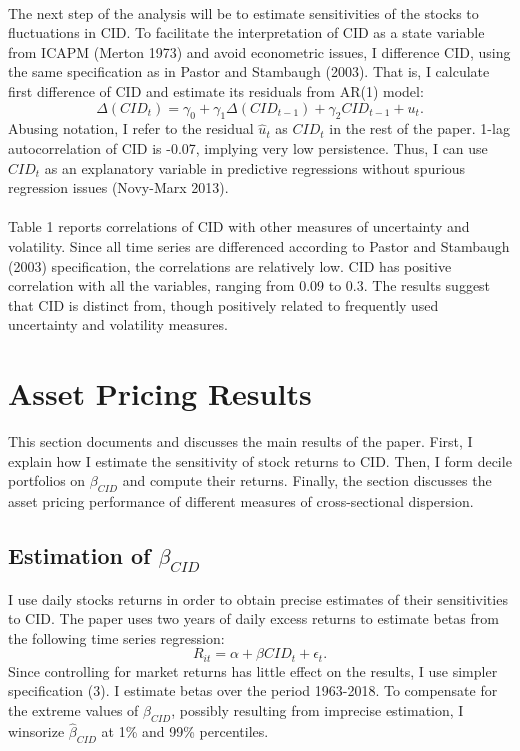 \documentclass[12pt]{article}
\begin{document}
\paragraph{}
The next step of the analysis will be to estimate sensitivities of the stocks to fluctuations in CID. To facilitate the interpretation of CID as a state variable from ICAPM (Merton 1973) and avoid econometric issues, I difference CID, using the same specification as in Pastor and Stambaugh (2003). That is, I calculate first difference of CID and estimate its residuals from AR(1) model:
\begin{equation}
\Delta(CID_t) = \gamma_0 + \gamma_1 \Delta(CID_{t-1}) + \gamma_2 CID_{t-1} + u_t.
\end{equation}
Abusing notation, I refer to the residual $\hat{u}_t$ as $CID_t$ in the rest of the paper. 1-lag autocorrelation of CID is -0.07, implying very low persistence. Thus, I can use $CID_t$ as an explanatory variable in predictive regressions without spurious regression issues (Novy-Marx 2013). 
\paragraph{}
Table 1 reports correlations of CID with other measures of uncertainty and volatility. Since all time series are differenced according to Pastor and Stambaugh (2003) specification, the correlations are relatively low. CID has positive correlation with all the variables, ranging from 0.09 to 0.3. The results suggest that CID is distinct from, though positively related to frequently used uncertainty and volatility measures.

\section{Asset Pricing Results} \label{sec:Model}

This section documents and discusses the main results of the paper. First, I explain how I estimate the sensitivity of stock returns to CID. Then, I form decile portfolios on $\beta_{CID}$ and compute their returns. Finally, the section discusses the asset pricing performance of different measures of cross-sectional dispersion.

\subsection{Estimation of $\beta_{CID}$}
I use daily stocks returns in order to obtain precise estimates of their sensitivities to CID. The paper uses two years of daily excess returns to estimate betas from the following time series regression:
\begin{equation}
R_{it}=\alpha+\beta CID_t + \epsilon_t.
\end{equation}
Since controlling for market returns has little effect on the results, I use simpler specification (3). I estimate betas over the period 1963-2018. To compensate for the extreme values of $\hat{\beta}_{CID}$, possibly resulting from imprecise estimation, I winsorize $\hat{\beta}_{CID}$ at 1\% and 99\% percentiles. 
\end{document}
